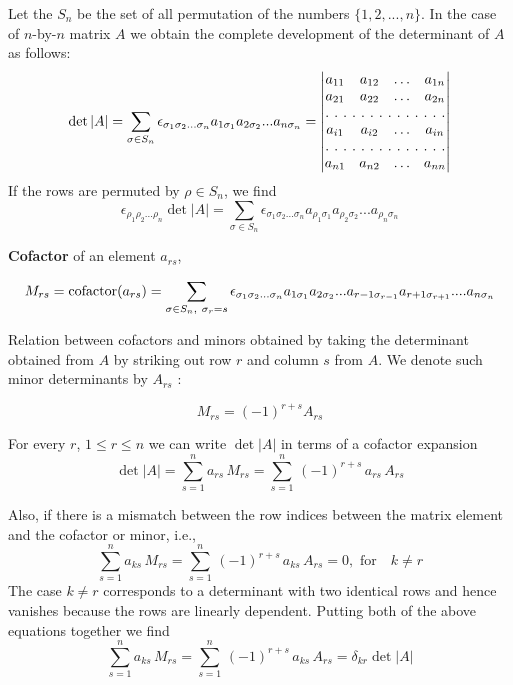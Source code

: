 Let the $S_n$ be the set of all permutation of the numbers $\{1,2,...,n\}$. In the case of $n$-by-$n$ matrix $A$ we obtain the complete 
development of the determinant of $A$ as follows: 
\begin{equation}
\det |A| = \sum_{\sigma \in S_{n}} \epsilon_{ \sigma_1 \sigma_2 ... \sigma_{n}} a_{1 \sigma_1} a_{2 \sigma_2} ... a_{n \sigma_n} \label{detA} = 
\begin{vmatrix}
a_{11} & a_{12}  & \hdots & a_{1n}  \\
a_{21} & a_{22}  & \hdots & a_{2n}  \\
\hdotsfor[2]{4}\\
a_{i1} & a_{i2}  & \hdots & a_{in}  \\
\hdotsfor[2]{4}\\
a_{n1} & a_{n2}  & \hdots & a_{nn}  \\
\end{vmatrix}
\end{equation}
If the rows are permuted by $\rho \in S_n$, we find
\begin{equation}
\epsilon_{ \rho_1 \rho_2 ... \rho_{n}}\det |A| = \sum_{\sigma \in S_{n}} \epsilon_{ \sigma_1 \sigma_2 ... \sigma_{n}} a_{\rho_1 \sigma_1} a_{\rho_2 \sigma_2} ... a_{\rho_n \sigma_n} \label{detA}
\end{equation}

{\bf Cofactor} of an element $a_{rs}$,

\begin{equation}
M _{rs}= \hbox{cofactor}(a_{rs}) =  \sum_{\sigma \in S_{n},~\sigma_{r} = s } \epsilon_{ \sigma_1 \sigma_2 ... \sigma_{n}} a_{1 \sigma_1}  a_{2 \sigma_2} ... a_{r-1 \sigma_{r-1}} a_{r+1 \sigma_{r+1}} ....a_{n \sigma_n} \label{detA}
\end{equation}

Relation between cofactors and minors obtained by taking the determinant obtained from $A$ by striking out row $r$ and column $s$ from $A$. We denote such minor determinants by $A_{rs}$ : 

$$M_{rs} = (-1)^{r+s} A_{rs}$$

For every $r$, $1\le r \le n$ we can write $\det |A |$ in terms of a cofactor expansion
\begin{equation}
\det |A| = \sum_{s=1}^n  a_{rs} \, M_{rs} = \sum_{s=1}^n\, (-1)^{r+s} \,a_{rs} \,A_{rs}  \label{cofactorExpansion}
\end{equation}

Also, if there is a mismatch between the row indices between the matrix element and the cofactor or minor, i.e., 
\begin{equation}
\sum_{s=1}^n  a_{ks} \, M_{rs} = \sum_{s=1}^n\, (-1)^{r+s} \,a_{ks} \,A_{rs}  = 0, \mbox{ for}\quad k\ne r  \label{cofactorExpansion}
\end{equation} The case $k\ne r$ corresponds to a determinant with two identical rows and hence vanishes because the rows are linearly dependent.  
Putting both of the above equations together we find
\begin{equation}
\sum_{s=1}^n  a_{ks} \, M_{rs} = \sum_{s=1}^n\, (-1)^{r+s} \,a_{ks} \,A_{rs} = \delta_{kr} \det |A|  \label{cofactorExpansion}
\end{equation}

